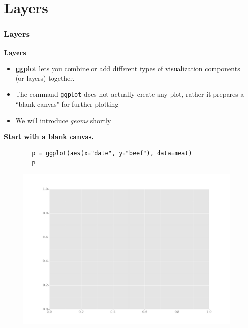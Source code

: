 \documentclass{beamer}
\begin{document}
\section{Layers}
\begin{frame}[fragile]
	\frametitle{Layers}
	\Large
	\noindent \textbf{Layers}
	\begin{itemize}
		\item \textbf{ggplot} lets you combine or add different types of visualization components (or layers) together. 
		\item The command \texttt{ggplot} does not actually create any plot, rather it prepares a ``blank canvas" for further plotting 
		\item We will introduce \textit{geoms} shortly
	\end{itemize}
	
\end{frame}
\begin{frame}[fragile]
\textbf{	Start with a blank canvas.}
	\begin{framed}
		\begin{verbatim}
		p = ggplot(aes(x="date", y="beef"), data=meat)
		p
		\end{verbatim}
	\end{framed}
	\begin{figure}
		\centering
		\includegraphics[width=0.7\linewidth]{Layers1}
	\end{figure}
	
\end{frame}
\end{document}
